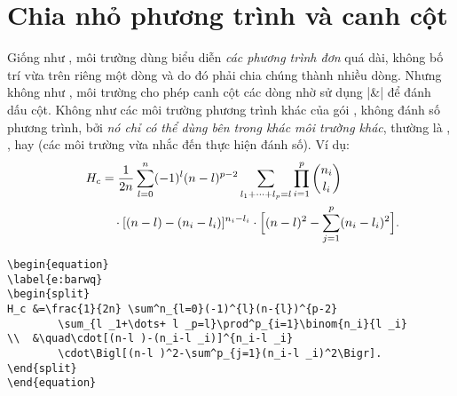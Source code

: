 \section{Chia nhỏ phương trình và canh cột}

Giống như , môi trường  dùng biểu diễn
\emph{các phương trình đơn} quá dài, không bố trí vừa trên riêng một dòng
và do đó phải chia chúng thành nhiều dòng.
Nhưng không như , môi trường 
cho phép canh cột các dòng nhờ sử dụng |&| để đánh dấu cột.
Không như các môi trường phương trình khác của gói ,
 không đánh số phương trình, bởi \emph{nó chỉ có thể dùng
bên trong khác môi trường khác}, thường là
, , hay 
(các môi trường vừa nhắc đến thực hiện đánh số). Ví dụ:
\begin{equation}\label{e:barwq}\begin{split}
H_c&=\frac{1}{2n} \sum^n_{l=0}(-1)^{l}(n-{l})^{p-2}
\sum_{l _1+\dots+ l _p=l}\prod^p_{i=1} \binom{n_i}{l _i}\\
&\quad\cdot[(n-l )-(n_i-l _i)]^{n_i-l _i}\cdot
\Bigl[(n-l )^2-\sum^p_{j=1}(n_i-l _i)^2\Bigr].
\kern-2em %
\end{split}\end{equation}

\begin{verbatim}
\begin{equation}
\label{e:barwq}
\begin{split}
H_c &=\frac{1}{2n} \sum^n_{l=0}(-1)^{l}(n-{l})^{p-2}
        \sum_{l _1+\dots+ l _p=l}\prod^p_{i=1}\binom{n_i}{l _i}
\\  &\quad\cdot[(n-l )-(n_i-l _i)]^{n_i-l _i}
        \cdot\Bigl[(n-l )^2-\sum^p_{j=1}(n_i-l _i)^2\Bigr].
\end{split}
\end{equation}
\end{verbatim}


